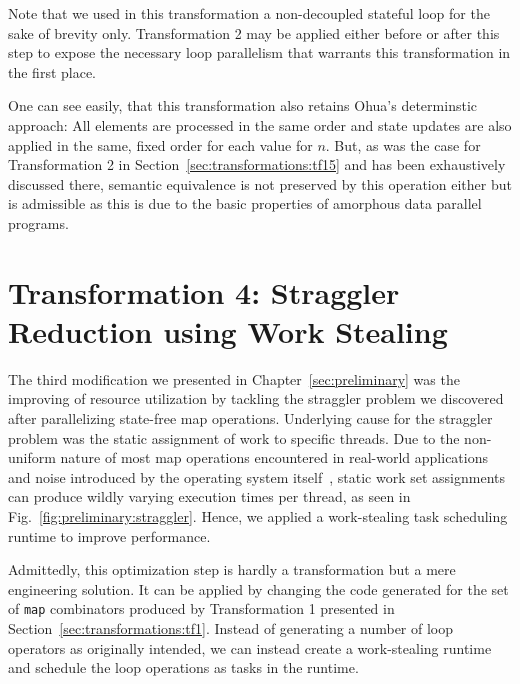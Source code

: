 Note that we used in this transformation a non-decoupled stateful loop for the sake of brevity only.
Transformation 2 may be applied either before or after this step to expose the necessary loop parallelism that warrants this transformation in the first place.

One can see easily, that this transformation also retains Ohua's determinstic approach: All elements are processed in the same order and state updates are also applied in the same, fixed order for each value for $n$.
But, as was the case for Transformation 2 in Section~\ref{sec:transformations:tf15} and has been exhaustively discussed there, semantic equivalence is not preserved by this operation either but is admissible as this is due to the basic properties of amorphous data parallel programs.

\section{Transformation 4: Straggler Reduction using Work Stealing}%
\label{sec:transformations:tf3}

The third modification we presented in Chapter~\ref{sec:preliminary} was the improving of resource utilization by tackling the straggler problem we discovered after parallelizing state-free map operations.
Underlying cause for the straggler problem was the static assignment of work to specific threads.
Due to the non-uniform nature of most map operations encountered in real-world applications and noise introduced by the operating system itself~\cite{lackorzynski2016decoupled}, static work set assignments can produce wildly varying execution times per thread, as seen in Fig.~\ref{fig:preliminary:straggler}.
Hence, we applied a work-stealing task scheduling runtime to improve performance.

Admittedly, this optimization step is hardly a transformation but a mere engineering solution.
It can be applied by changing the code generated for the set of \texttt{map} combinators produced by Transformation 1 presented in Section~\ref{sec:transformations:tf1}.
Instead of generating a number of loop operators as originally intended, we can instead create a work-stealing runtime and schedule the loop operations as tasks in the runtime.






